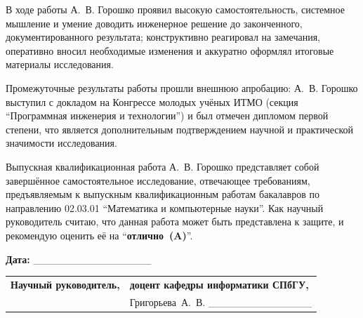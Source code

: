 \documentclass[12pt,a4paper]{article}
\begin{document}
В ходе работы А.~В. Горошко проявил высокую самостоятельность,
системное мышление и умение доводить инженерное решение до
законченного, документированного результата; конструктивно реагировал
на замечания, оперативно вносил необходимые изменения и аккуратно
оформлял итоговые материалы исследования.

Промежуточные результаты работы прошли внешнюю апробацию: А.~В. Горошко
выступил с докладом на Конгрессе молодых учёных ИТМО (секция
\enquote{Программная инженерия и технологии}) и был отмечен дипломом
первой степени, что является дополнительным подтверждением научной и
практической значимости исследования.

Выпускная квалификационная работа А.~В. Горошко представляет собой
завершённое самостоятельное исследование, отвечающее требованиям,
предъявляемым к выпускным квалификационным работам бакалавров по
направлению 02.03.01 \enquote{Математика и компьютерные науки}. Как
научный руководитель считаю, что данная работа может быть представлена
к защите, и рекомендую оценить её на \enquote{\textbf{отлично~(A)}}.

\vspace{1.2em}

\noindent\textbf{Дата:} \_\_\_\_\_\_\_\_\_\_\_\_\_\_\_\_

\vspace{2.5em}

\noindent\begin{tabular}{@{}p{5cm}p{9cm}@{}}
\textbf{Научный руководитель,} & \textbf{доцент кафедры информатики СПбГУ,} \\
& Григорьева~А.~В. \hfill \_\_\_\_\_\_\_\_\_\_\_\_\_\_
\end{tabular}
\end{document}
